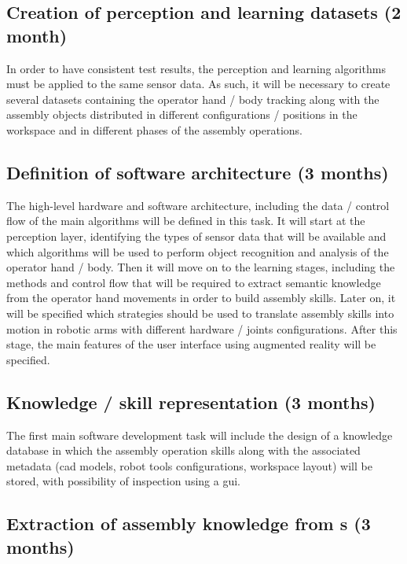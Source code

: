 \subsection{Creation of perception and learning datasets (2 month)}

In order to have consistent test results, the perception and learning algorithms must be applied to the same sensor data. As such, it will be necessary to create several datasets containing the operator hand / body tracking along with the assembly objects distributed in different configurations / positions in the workspace and in different phases of the assembly operations.


\subsection{Definition of software architecture (3 months)}

The high-level hardware and software architecture, including the data / control flow of the main algorithms will be defined in this task. It will start at the perception layer, identifying the types of sensor data that will be available and which algorithms will be used to perform object recognition and analysis of the operator hand / body. Then it will move on to the learning stages, including the methods and control flow that will be required to extract semantic knowledge from the operator hand movements in order to build assembly skills. Later on, it will be specified which strategies should be used to translate assembly skills into motion in robotic arms with different hardware / joints configurations. After this stage, the main features of the user interface using augmented reality will be specified.


\subsection{Knowledge / skill representation (3 months)}

The first main software development task will include the design of a knowledge database in which the assembly operation skills along with the associated metadata (\gls{cad} models, robot tools configurations, workspace layout) will be stored, with possibility of inspection using a \gls{gui}.


\subsection{Extraction of assembly knowledge from s (3 months)}

